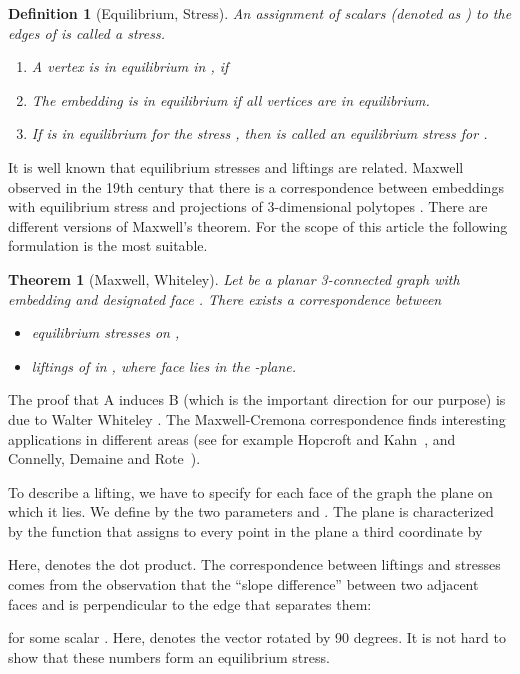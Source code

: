 \documentclass{article}
\theoremstyle{plain} \newtheorem{thm}{Theorem}[section]
\newtheorem{defn}{Definition}
\begin{document}
\begin{defn}[Equilibrium, Stress]
  An assignment  of scalars \textup(denoted as
  \textup) to the edges of  is
  called a \emph{stress}.
\begin{enumerate}
\item A vertex  is in equilibrium in , if

\item The embedding  is in equilibrium if all vertices
  are in equilibrium.
\item If  is in equilibrium for the stress , then
   is called an equilibrium stress for .
\end{enumerate}
\end{defn}
It is well known that equilibrium stresses and liftings are related.
Maxwell observed
in the 19th century
 that there is a correspondence between
embeddings with equilibrium stress and projections of 3-dimensional
polytopes \cite{m-rfdf-64}. 
There are different versions of Maxwell's
theorem. For the scope of this article the following formulation is the most
suitable. 
\begin{thm}[Maxwell,
  Whiteley] Let  be a planar 3-connected graph with embedding  and 
designated face . There exists a correspondence between
\begin{itemize}
\item[\rm A)] equilibrium stresses  on ,
\item[\rm B)] liftings of  in , where face  lies in the
  -plane.
\end{itemize}
\end{thm}
The proof that A induces B (which is the important direction for our purpose) is  due to Walter Whiteley \cite{w-mspp-82}. The Maxwell-Cremona correspondence finds interesting applications in different areas (see for example
Hopcroft and  Kahn~\cite{hk-prga-92}, and Connelly, Demaine and Rote~\cite{cdr-spcpc-03}).

To describe a lifting, we have to specify for each face  of the
graph the plane  on which it lies.
 We define  by the two
parameters  and . The plane  is characterized
by the function that assigns to every point  in the plane a third coordinate by

Here,  denotes the dot product.
The correspondence between liftings and stresses comes from the
observation that the ``slope difference'' 
between two adjacent faces  and  is perpendicular to the
edge  that separates them:

for some scalar .
Here,  denotes the vector 
rotated by 90 degrees.
It is not hard to show that these numbers  form an
equilibrium stress.
\end{document}
